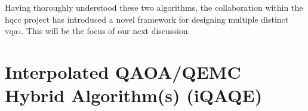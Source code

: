
Having thoroughly understood these two algorithms, the collaboration within the \acrshort{hqcc} project has introduced a novel framework for designing multiple distinct \acrshort{vqa}\textcolor{gray}{s}. This will be the focus of our next discussion.


\section{Interpolated QAOA/QEMC Hybrid Algorithm(s) (iQAQE)}
\label{section:iQAQE}


